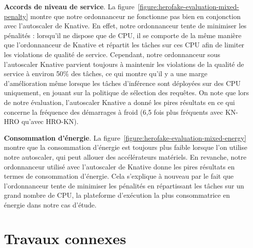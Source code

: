 \textbf{Accords de niveau de service}. La figure~\ref{figure:herofake-evaluation-mixed-penalty} montre que notre ordonnanceur ne fonctionne pas bien en conjonction avec l'autoscaler de Knative. En effet, notre ordonnanceur tente de minimiser les pénalités : lorsqu'il ne dispose que de CPU, il se comporte de la même manière que l'ordonnanceur de Knative et répartit les tâches sur ces CPU afin de limiter les violations de qualité de service. Cependant, notre ordonnanceur sous l'autoscaler Knative parvient toujours à maintenir les violations de la qualité de service à environ 50\% des tâches, ce qui montre qu'il y a une marge d'amélioration même lorsque les tâches d'inférence sont déployées sur des CPU uniquement, en jouant sur la politique de sélection des requêtes. On note que lors de notre évaluation, l'autoscaler Knative a donné les pires résultats en ce qui concerne la fréquence des démarrages à froid (6,5 fois plus fréquents avec KN-HRO qu'avec HRO-KN).

\textbf{Consommation d'énergie}. La figure~\ref{figure:herofake-evaluation-mixed-energy} montre que la consommation d'énergie est toujours plus faible lorsque l'on utilise notre autoscaler, qui peut allouer des accélérateurs matériels. En revanche, notre ordonnanceur utilisé avec l'autoscaler de Knative donne les pires résultats en termes de consommation d'énergie. Cela s'explique à nouveau par le fait que l'ordonnanceur tente de minimiser les pénalités en répartissant les tâches sur un grand nombre de CPU, la plateforme d'exécution la plus consommatrice en énergie dans notre cas d'étude.

\section{Travaux connexes}
\label{section:herofake-sota}

